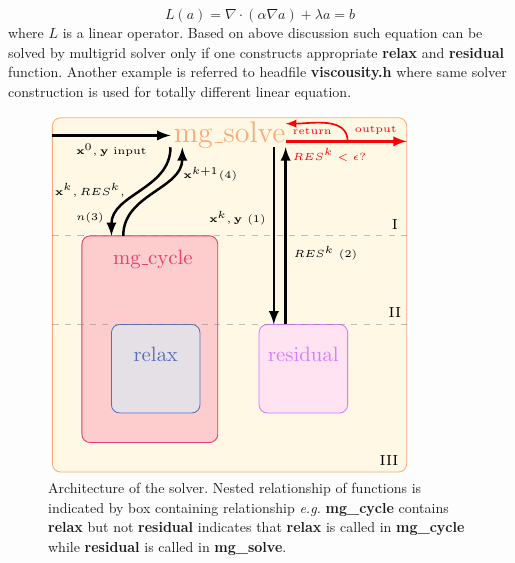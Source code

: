 \documentclass[a4paper]{article}
\newcommand{\func}[1]{\textbf{\textcolor{function}{#1}}}
\begin{document}
\begin{equation}
  L(a)=\nabla\cdot(\alpha\nabla a) + \lambda a =b
\end{equation}
where $L$ is a linear operator. Based on above discussion such equation can be solved by multigrid solver only if one constructs appropriate \func{relax} and \func{residual} function. Another example is referred to headfile \textbf{viscousity.h} where same solver construction is used for totally different linear equation. 

\begin{figure}[H]
    \centering
    \includegraphics[width=\textwidth]{image/mgsolver.pdf}
    \caption{Architecture of the solver. Nested relationship of functions is indicated by box containing relationship \emph{e.g.} \func{mg\_cycle} contains \func{relax} but not \func{residual} indicates that \func{relax} is called in \func{mg\_cycle} while \func{residual} is called in \func{mg\_solve}.}
    \label{fig:workflow}
\end{figure}
\end{document}

